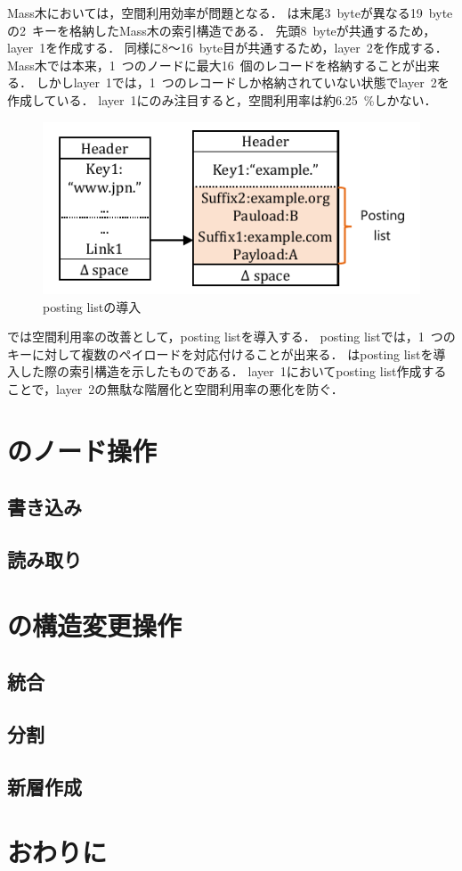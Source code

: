 Mass木においては，空間利用効率が問題となる．
\Fig{\ref{fig:memory}}は末尾3~byteが異なる19~byteの2~キーを格納したMass木の索引構造である．
先頭8~byteが共通するため，layer~1を作成する．
同様に8～16~byte目が共通するため，layer~2を作成する．
Mass木では本来，1~つのノードに最大16~個のレコードを格納することが出来る．
しかしlayer~1では，1~つのレコードしか格納されていない状態でlayer~2を作成している．
layer~1にのみ注目すると，空間利用率は約6.25~\%しかない．

\begin{figure}[t]
    \centering
    \includegraphics{./figures/posting_list.pdf}
    \caption{posting listの導入}
    \label{fig:posting_list}
\end{figure}

\Bcforest{}では空間利用率の改善として，posting listを導入する．
posting listでは，1~つのキーに対して複数のペイロードを対応付けることが出来る．
\Fig{\ref{fig:posting_list}}はposting listを導入した際の索引構造を示したものである．
layer~1においてposting list作成することで，layer~2の無駄な階層化と空間利用率の悪化を防ぐ．


\section{\Bcforest{}のノード操作}
\label{sec:node_operation}

\subsection{書き込み}

\subsection{読み取り}

\section{\Bcforest{}の構造変更操作}
\label{sec:smo}

\subsection{統合}
\subsection{分割}
\subsection{新層作成}

\section{おわりに}
\label{sec:conclusion}

